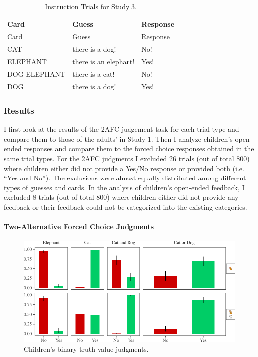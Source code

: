 \documentclass[man]{apa6}
\theoremstyle{definition}
\theoremstyle{definition}
\theoremstyle{definition}
\theoremstyle{remark}
\begin{document}
\begin{longtable}[]{@{}lll@{}}
\caption{\label{tab:instructionStudy3} Instruction Trials for Study
3.}\tabularnewline
\toprule
Card & Guess & Response\tabularnewline
\midrule
\endfirsthead
\toprule
Card & Guess & Response\tabularnewline
\midrule
\endhead
CAT & there is a dog! & No!\tabularnewline
ELEPHANT & there is an elephant! & Yes!\tabularnewline
DOG-ELEPHANT & there is a cat! & No!\tabularnewline
DOG & there is a dog! & Yes!\tabularnewline
\bottomrule
\end{longtable}

\subsubsection{Results}\label{results-2}

I first look at the results of the 2AFC judgement task for each trial
type and compare them to those of the adults' in Study 1. Then I analyze
children's open-ended responses and compare them to the forced choice
responses obtained in the same trial types. For the 2AFC judgments I
excluded 26 trials (out of total 800) where children either did not
provide a Yes/No response or provided both (i.e. \enquote{Yes and No}).
The exclusions were almost equally distributed among different types of
guesses and cards. In the analysis of children's open-ended feedback, I
excluded 8 trials (out of total 800) where children either did not
provide any feedback or their feedback could not be categorized into the
existing categories.

\paragraph{Two-Alternative Forced Choice
Judgments}\label{two-alternative-forced-choice-judgments}

\begin{figure}[t]

{\centering \includegraphics{figs/Study3tvjtPlot-1} 

}

\caption{Children's binary truth value judgments.}\label{fig:Study3tvjtPlot}
\end{figure}
\end{document}
